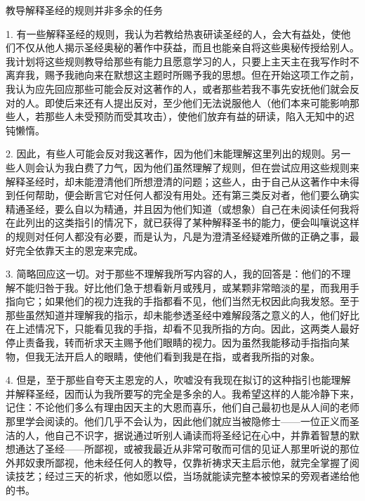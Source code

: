 教导解释圣经的规则并非多余的任务\par

1. 有一些解释圣经的规则，我认为若教给热衷研读圣经的人，会大有益处，使他们不仅从他人揭示圣经奥秘的著作中获益，而且也能亲自将这些奥秘传授给别人。我计划将这些规则教导给那些有能力且愿意学习的人，只要上主天主在我写作时不离弃我，赐予我祂向来在默想这主题时所赐予我的思想。但在开始这项工作之前，我认为应先回应那些可能会反对这著作的人，或者那些若我不事先安抚他们就会反对的人。即使后来还有人提出反对，至少他们无法说服他人（他们本来可能影响那些人，若那些人未受预防而受其攻击），使他们放弃有益的研读，陷入无知中的迟钝懒惰。\par

2. 因此，有些人可能会反对我这著作，因为他们未能理解这里列出的规则。另一些人则会认为我白费了力气，因为他们虽然理解了规则，但在尝试应用这些规则来解释圣经时，却未能澄清他们所想澄清的问题；这些人，由于自己从这著作中未得到任何帮助，便会断言它对任何人都没有用处。还有第三类反对者，他们要么确实精通圣经，要么自以为精通，并且因为他们知道（或想象）自己在未阅读任何我将在此列出的这类指引的情况下，就已获得了某种解释圣书的能力，便会叫嚷说这样的规则对任何人都没有必要，而是认为，凡是为澄清圣经疑难所做的正确之事，最好完全依靠天主的恩宠来完成。\par

3. 简略回应这一切。对于那些不理解我所写内容的人，我的回答是：他们的不理解不能归咎于我。好比他们急于想看新月或残月，或某颗非常暗淡的星，而我用手指向它；如果他们的视力连我的手指都看不见，他们当然无权因此向我发怒。至于那些虽然知道并理解我的指示，却未能参透圣经中难解段落之意义的人，他们好比在上述情况下，只能看见我的手指，却看不见我所指的方向。因此，这两类人最好停止责备我，转而祈求天主赐予他们眼睛的视力。因为虽然我能移动手指指向某物，但我无法开启人的眼睛，使他们看到我是在指，或者我所指的对象。\par

4. 但是，至于那些自夸天主恩宠的人，吹嘘没有我现在拟订的这种指引也能理解并解释圣经，因而认为我所要写的完全是多余的人。我希望这样的人能冷静下来，记住：不论他们多么有理由因天主的大恩而喜乐，他们自己最初也是从人间的老师那里学会阅读的。他们几乎不会认为，因此他们就应当被隐修士——一位正义而圣洁的人，他自己不识字，据说通过听别人诵读而将圣经记在心中，并靠着智慧的默想通达了圣经——所鄙视，或被我最近从非常可敬而可信的见证人那里听说的那位外邦奴隶所鄙视，他未经任何人的教导，仅靠祈祷求天主启示他，就完全掌握了阅读技艺；经过三天的祈求，他如愿以偿，当场就能读完整本被惊呆的旁观者递给他的书。\par


